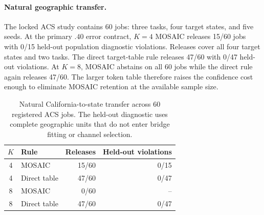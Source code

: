 \paragraph{Natural geographic transfer.}
The locked ACS study contains 60 jobs: three tasks, four target states, and
five seeds. At the primary $.40$ error contract, $K=4$ MOSAIC releases 15/60
jobs with 0/15 held-out population diagnostic violations. Releases cover all
four target states and two tasks. The direct target-table rule releases 47/60
with 0/47 held-out violations. At $K=8$, MOSAIC abstains on all 60 jobs while
the direct rule again releases 47/60. The larger token table therefore raises
the confidence cost enough to eliminate MOSAIC retention at the available
sample size.

\begin{table}[t]
\centering
\scriptsize
\setlength{\tabcolsep}{4pt}
\begin{tabular}{clrr}
\hline
$K$ & Rule & Releases & Held-out violations \\
\hline
4 & MOSAIC & 15/60 & 0/15 \\
4 & Direct table & 47/60 & 0/47 \\
8 & MOSAIC & 0/60 & -- \\
8 & Direct table & 47/60 & 0/47 \\
\hline
\end{tabular}
\caption{Natural California-to-state transfer across 60 registered ACS jobs.
The held-out diagnostic uses complete geographic units that do not enter
bridge fitting or channel selection.}
\label{tab:acs-natural-shift}
\end{table}
